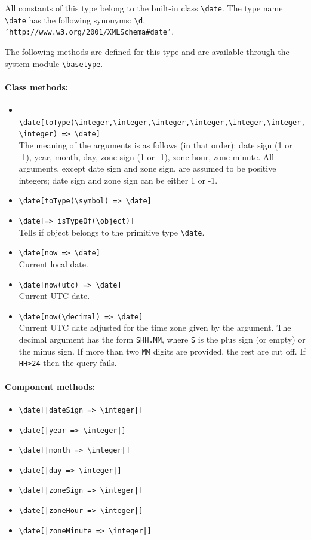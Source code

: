 \documentclass[11pt]{article}
\newcommand{\bs}{\textbackslash}
\begin{document}
\index{class!\bs{}date}
All constants of this type belong to the built-in class {\tt \bs{}date}. 
The type name {\tt \bs{}date} has the following synonyms: 
{\tt \bs{}d},  {\tt 'http://www.w3.org/2001/XMLSchema\#date'}. 

The following methods are defined for this type and are available through
the system module {\tt \bs{}basetype}.
\paragraph{Class methods:}
\begin{itemize}
\item {\tt
    \bs{}date[toType(\bs{}integer,\bs{}integer,\bs{}integer,\bs{}integer,\bs{}integer,\bs{}integer,\bs{}integer)
    => \bs{}date]}
  \\
  The meaning of the arguments is as follows (in that order): date sign (1
  or -1), year, month, day, zone sign (1 or -1), zone hour, zone minute.
  All arguments, except date sign and zone sign, are assumed to be positive
  integers; date sign and zone sign can be either 1 or -1.
    \item {\tt \bs{}date[toType(\bs{}symbol) => \bs{}date]}
    \item {\tt \bs{}date[=> isTypeOf(\bs{}object)]}\\
      Tells if object belongs to the primitive type {\tt \bs{}date}. 
\item \texttt{\bs{}date[now => \bs{}date]} \\
  Current local date.
\item \texttt{\bs{}date[now(utc) => \bs{}date]} \\
  Current UTC date.
\item \texttt{\bs{}date[now(\bs{}decimal) => \bs{}date]} \\
  Current UTC date adjusted for the time zone given by the argument.
  The decimal argument has the form \texttt{SHH.MM}, where \texttt{S} is
  the plus sign (or empty) or the minus sign.
  If more than two \texttt{MM} digits are provided, the rest are cut off.
  If \texttt{HH>24} then the query fails. 
\end{itemize}

\paragraph{Component methods:}
\begin{itemize}
\item {\tt \bs{}date[|dateSign => \bs{}integer|]}   
\item {\tt \bs{}date[|year => \bs{}integer|]}   
\item {\tt \bs{}date[|month => \bs{}integer|]}  
\item {\tt \bs{}date[|day => \bs{}integer|]}   
\item {\tt \bs{}date[|zoneSign => \bs{}integer|]}   
\item {\tt \bs{}date[|zoneHour => \bs{}integer|]}  
\item {\tt \bs{}date[|zoneMinute => \bs{}integer|]}    
\end{itemize}
\end{document}
